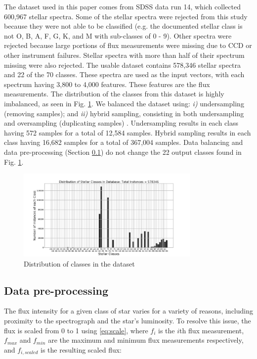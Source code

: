 \documentclass[conference]{IEEEtran}
\begin{document}
	The dataset used in this paper comes from SDSS data run 14, which collected 600,967 stellar spectra. Some of the stellar spectra were rejected from this study because they were not able to be classified (e.g. the documented stellar class is not O, B, A, F, G, K, and M with sub-classes of 0 - 9). Other spectra were rejected because large portions of flux measurements were missing due to CCD or other instrument failures. Stellar spectra with more than half of their spectrum missing were also rejected. The usable dataset contains 578,346 stellar spectra and 22 of the 70 classes. These spectra are used as the input vectors, with each spectrum having 3,800 to 4,000 features. These features are the flux measurements. The distribution of the classes from this dataset is highly imbalanced, as seen in Fig. \ref{fig:dist}. We balanced the dataset using: \textit{i)} undersampling (removing samples); and \textit{ii)}  hybrid sampling, consisting in both undersampling and oversampling (duplicating samples)  \cite{Japkowicz}. Undersampling results in each class having 572 samples for a total of 12,584 samples. Hybrid sampling results in each class having 16,682 samples for a total of 367,004 samples. Data balancing and data pre-processing (Section \ref{sec:pre-proc}) do not change the 22 output classes found in Fig. \ref{fig:dist}.

        \begin{figure}
            \centering
            \includegraphics[width=3.5in]{Distribution.png}
            \caption{Distribution of classes in the dataset}
            \label{fig:dist}
        \end{figure}


	\subsection{Data pre-processing}\label{sec:pre-proc}

The flux intensity for a given class of star varies for a variety of reasons, including proximity to the spectrograph and the star's luminosity. To resolve this issue, the flux is scaled from 0 to 1 using \eqref{eq:scale}, where $f_i$ is the \(i\)th  flux measurement, $f_{max}$ and $f_{min}$ are the maximum and minimum flux measurements respectively, and $f_{i, scaled}$ is the resulting scaled flux:
        
\end{document}
